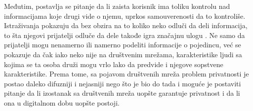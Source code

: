 \documentclass[a4paper]{article}
\begin{document}
\par Međutim, postavlja se pitanje da li zaista korisnik ima toliku kontrolu nad informacijama koje drugi vide o njemu, uprkos samouverenosti da to kontroliše. Istraživanja pokazuju da bez obzira na to koliko neko odluči da deli informacija, to šta njegovi prijatelji odluče da dele takođe igra značajnu ulogu \cite{sm3}. Ne samo da prijatelji mogu nenamerno ili namerno podeliti informacije o pojedincu, već se pokazuje da čak iako neko nije na društvenim mrežama, karakteristike ljudi sa kojima se ta osoba druži mogu vrlo lako da predvide i njegove sopstvene karakteristike. Prema tome, sa pojavom društvenih mreža problem privatnosti je postao daleko difuzniji i nejasniji nego što je bio do tada i moguće je postaviti pitanje da li izostanak sa društvenih mreža uopšte garantuje privatnost i da li ona u digitalnom dobu uopšte postoji.
\end{document}
